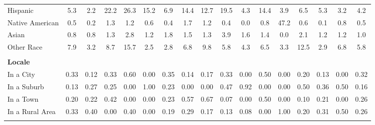 \begin{tabular*}{\linewidth}{@{\extracolsep{\fill} } lcccccccccccccccc}
\hspace{0.2cm}Hispanic&5.3&2.2&22.2&26.3&15.2&6.9&14.4&12.7&19.5&4.3&14.4&3.9&6.5&5.3&3.2&4.2\\%
\hspace{0.2cm}Native American&0.5&0.2&1.3&1.2&0.6&0.4&1.7&1.2&0.4&0.0&0.8&47.2&0.6&0.1&0.8&0.5\\%
\hspace{0.2cm}Asian&0.8&0.8&1.3&2.8&1.2&1.8&1.5&1.3&3.9&1.6&1.4&0.0&2.1&1.2&1.2&1.0\\%
\hspace{0.2cm}Other Race&7.9&3.2&8.7&15.7&2.5&2.8&6.8&9.8&5.8&4.3&6.5&3.3&12.5&2.9&6.8&5.8\\%
&&&&&&&&&&&&&&&&\\%
\multicolumn{17}{l}{\bfseries Locale}\\%
\hspace{0.2cm}In a City&0.33&0.12&0.33&0.60&0.00&0.35&0.14&0.17&0.33&0.00&0.50&0.00&0.20&0.13&0.00&0.32\\%
\hspace{0.2cm}In a Suburb&0.13&0.27&0.25&0.00&1.00&0.23&0.00&0.00&0.47&0.92&0.00&0.00&0.50&0.36&0.50&0.16\\%
\hspace{0.2cm}In a Town&0.20&0.22&0.42&0.00&0.00&0.23&0.57&0.67&0.07&0.00&0.50&0.00&0.10&0.21&0.00&0.26\\%
\hspace{0.2cm}In a Rural Area&0.33&0.40&0.00&0.40&0.00&0.19&0.29&0.17&0.13&0.08&0.00&1.00&0.20&0.31&0.50&0.26\\%
&&&&&&&&&&&&&&&&\\%
\hline%
\end{tabular*}